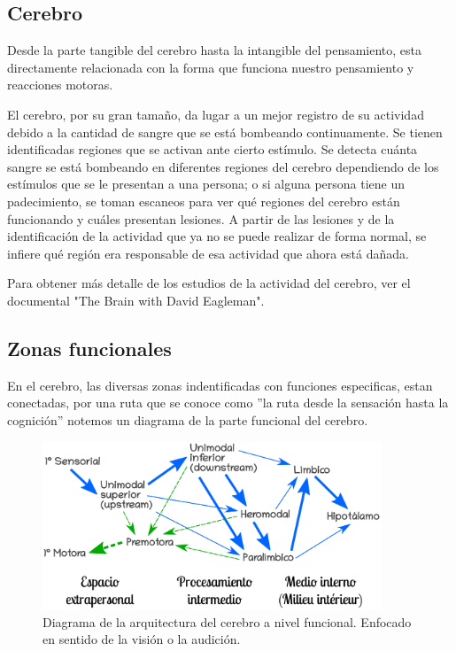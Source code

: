 \subsection{Cerebro}

Desde la parte tangible del cerebro hasta la intangible del pensamiento, esta directamente relacionada con la forma que funciona nuestro pensamiento y reacciones motoras.

El cerebro, por su gran tamaño, da lugar a un mejor registro de su actividad debido a la cantidad de sangre que se está bombeando continuamente. Se tienen identificadas regiones que se activan ante cierto estímulo.\cite{neurona_A_cerebro} Se detecta cuánta sangre se está bombeando en diferentes regiones del cerebro dependiendo de los estímulos que se le presentan a una persona; o si alguna persona tiene un padecimiento, se toman escaneos para ver qué regiones del cerebro están funcionando y cuáles presentan lesiones. A partir de las lesiones y de la identificación de la actividad que ya no se puede realizar de forma normal, se infiere qué región era responsable de esa actividad que ahora está dañada.\cite{estudiosF}

Para obtener más detalle de los estudios de la actividad del cerebro, ver el documental "The Brain with David Eagleman".

\subsection{Zonas funcionales}

En el cerebro, las diversas zonas indentificadas con funciones especificas, estan conectadas, por una ruta que se conoce como 
 ''la ruta desde la sensación hasta la cognición'' notemos un diagrama de la parte funcional del cerebro. \cite{sensAcogn}  


 \begin{figure}[h]
  \centering
  \includegraphics[width=0.9\textwidth]{../Figuras/zonasFuncionales.png}
  \caption{Diagrama de la arquitectura del cerebro a nivel funcional. Enfocado en sentido de la visión o la audición. \parencite{Mesulam1998}}
  \label{fig:zonasFun}
 \end{figure}

